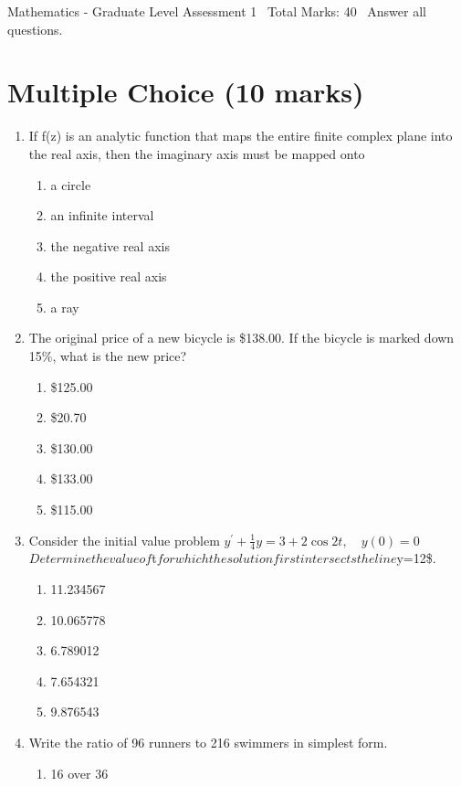 \documentclass[12pt]{article}
\begin{document}
\begin{center}
Mathematics - Graduate Level Assessment 1 \
Total Marks: 40 \
Answer all questions.
\end{center}

\section*{Multiple Choice (10 marks)}
\begin{enumerate}[label=\arabic*.]
\item If f(z) is an analytic function that maps the entire finite complex plane into the real axis, then the imaginary axis must be mapped onto
\begin{enumerate}[label=(\alph*)]
    \item a circle
    \item an infinite interval
    \item the negative real axis
    \item the positive real axis
    \item a ray
\end{enumerate}
\item The original price of a new bicycle is \$138.00. If the bicycle is marked down 15\%, what is the new price?
\begin{enumerate}[label=(\alph*)]
    \item \$125.00
    \item \$20.70
    \item \$130.00
    \item \$133.00
    \item \$115.00
\end{enumerate}
\item Consider the initial value problem $ y^{\prime}+\frac{1}{4} y=3+2 \cos 2 t, \quad y(0)=0 $$ Determine the value of $t$ for which the solution first intersects the line $y=12\$.
\begin{enumerate}[label=(\alph*)]
    \item 11.234567
    \item 10.065778
    \item 6.789012
    \item 7.654321
    \item 9.876543
\end{enumerate}
\item Write the ratio of 96 runners to 216 swimmers in simplest form.
\begin{enumerate}[label=(\alph*)]
    \item 16 over 36

\end{enumerate}$$
\end{enumerate}
\end{document}
